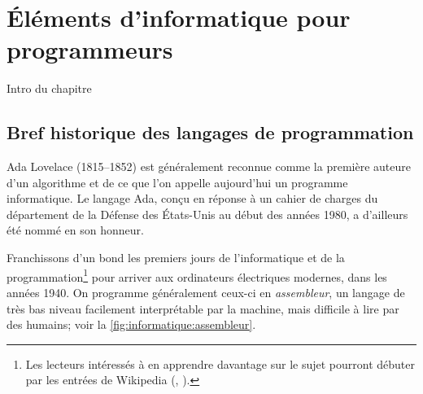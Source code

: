 
\chapter{Éléments d'informatique pour programmeurs}
\label{chap:informatique}

Intro du chapitre

\section{Bref historique des langages de programmation}
\label{sec:informatique:historique}

Ada Lovelace (1815--1852) est généralement reconnue comme la première
auteure d'un algorithme et de ce que l'on appelle aujourd'hui un
programme informatique. Le langage Ada, conçu en réponse à un cahier
de charges du département de la Défense des États-Unis au début des
années 1980, a d'ailleurs été nommé en son honneur.

Franchissons d'un bond les premiers jours de l'informatique et de la
programmation\footnote{%
  Les lecteurs intéressés à en apprendre davantage sur le sujet
  pourront débuter par les entrées de Wikipedia
  (,
  ).} %
pour arriver aux ordinateurs électriques modernes, dans les années
1940. On programme généralement ceux-ci en \emph{assembleur}, un
langage de très bas niveau facilement interprétable par la machine,
mais difficile à lire par des humains; voir la
\autoref{fig:informatique:assembleur}.

